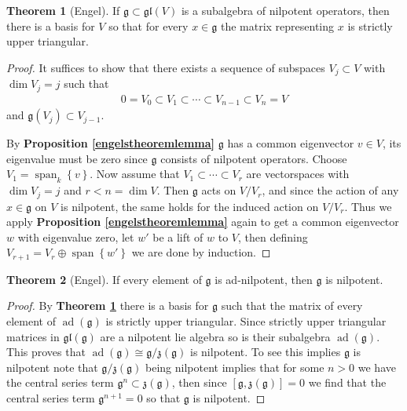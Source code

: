 \documentclass[10.5pt]{article}
\theoremstyle{definition}
\newtheorem{theorem}{Theorem}
\numberwithin{example}{subsection}
\numberwithin{pb}{subsection}
\newcommand{\set}[1]{\left\{#1\right\}}
\begin{document}
        \begin{theorem}[Engel]\label{engel2}
            If \(\mathfrak{g} \subset \mathfrak{gl}(V)\) is a subalgebra of nilpotent operators, then there is a basis for \(V\) so that for every \(x \in \mathfrak{g}\) the matrix representing \(x\) is strictly upper triangular.

            \begin{proof}
                It suffices to show that there exists a sequence of subspaces \(V_j \subset V\) with \(\dim V_j = j\) such that
                \begin{align}
                    0 = V_0 \subset V_1 \subset \cdots \subset V_{n-1} \subset V_n = V
                \end{align}
                and \(\mathfrak{g}(V_j) \subset V_{j-1}\).

                By \textbf{Proposition \ref{engelstheoremlemma}} \(\mathfrak{g}\) has a common eigenvector \(v \in V\), its eigenvalue must be zero since \(\mathfrak{g}\) consists of nilpotent operators. Choose \(V_1 = \operatorname{span}_k\set{v}\). Now assume that \(V_1\subset\cdots\subset V_r\) are vectorspaces with \(\dim V_j = j\) and \(r < n = \dim V\). Then \(\mathfrak{g}\) acts on \(V/V_r\), and since the action of any \(x \in \mathfrak{g}\) on \(V\) is nilpotent, the same holds for the induced action on \(V/V_r\). Thus we apply \textbf{Proposition \ref{engelstheoremlemma}} again to get a common eigenvector \(w\) with eigenvalue zero, let \(w'\) be a lift of \(w\) to \(V\), then defining \(V_{r+1} = V_r \oplus \operatorname{span}\set{w'}\) we are done by induction.
            \end{proof}
        \end{theorem}

        \begin{theorem}[Engel]\label{engel}
            If every element of \(\mathfrak{g}\) is ad-nilpotent, then \(\mathfrak{g}\) is nilpotent.

            \begin{proof}
                By \textbf{Theorem \ref{engel2}} there is a basis for \(\mathfrak{g}\) such that the matrix of every element of \(\operatorname{ad}(\mathfrak{g})\) is strictly upper triangular. Since strictly upper triangular matrices in \(\mathfrak{gl}(\mathfrak{g})\) are a nilpotent lie algebra so is their subalgebra \(\operatorname{ad}(\mathfrak{g})\). This proves that \(\operatorname{ad}(\mathfrak{g}) \cong \mathfrak{g}/\mathfrak{z}(\mathfrak{g})\) is nilpotent. To see this implies \(\mathfrak{g}\) is nilpotent note that \(\mathfrak{g}/\mathfrak{z}(\mathfrak{g})\) being nilpotent implies that for some \(n > 0\) we have the central series term \(\mathfrak{g}^{n} \subset \mathfrak{z}(\mathfrak{g})\), then since \([\mathfrak{g},\mathfrak{z}(\mathfrak{g})] = 0\) we find that the central series term \(\mathfrak{g}^{n+1} = 0\) so that \(\mathfrak{g}\) is nilpotent.
            \end{proof}
        \end{theorem}
\end{document}
